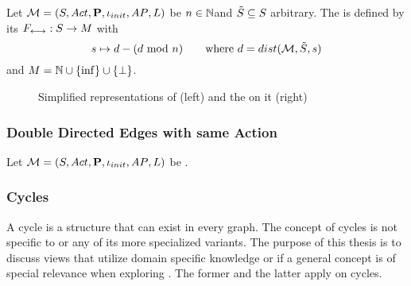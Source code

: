 \documentclass[preview]{standalone}
\begin{document}
\begin{definition}
		Let ${{{\mathcal{M}}}} = {{({S}, {Act}, {\textbf{P}}, {\iota_{init}}, {AP}, {L})}}$ be \achgphN $n \in {\mathbb{N}}$and ${\tilde{{S}}} \subseteq {S}$ arbitrary.  The \viewN \viewdistance is defined by its \grpfctN ${{F_{{\longleftrightarrow}}}} : {S} \to {\ensuremath{{M}}}$ with 
		\[
		{s} \mapsto {d} - ({d} \text{ mod } n) \quad \quad \text{where } {d} = {dist}({{{\mathcal{M}}}},{\tilde{{S}}}, {s})
		\]
		and ${{M}} = {\mathbb{N}} \cup \{\inf\} \cup {\{\bot\}}$.
\end{definition}

\begin{figure}[h]
	\begin{minipage}{.6\textwidth}
		
	\end{minipage}%
	\begin{minipage}{.5\textwidth}
		
	\end{minipage}
	\caption{Simplified representations of \mdp (left) and the \viewN \viewdistance on it (right)}
	\label{fig:Distance}  
\end{figure}





\subsubsection{Double Directed Edges with same Action}
\begin{definition}
	Let ${{{\mathcal{M}}}} = {{({S}, {Act}, {\textbf{P}}, {\iota_{init}}, {AP}, {L})}}$ be \achgphN.
\end{definition}

\subsubsection{Cycles}
A cycle is a structure that can exist in every graph. The concept of cycles is not specific to \chgphsN or any of its more specialized variants. The purpose of this thesis is to discuss views that utilize domain specific knowledge or if a general concept is of special relevance when exploring \achgphN. The former and the latter apply on cycles.
\end{document}
